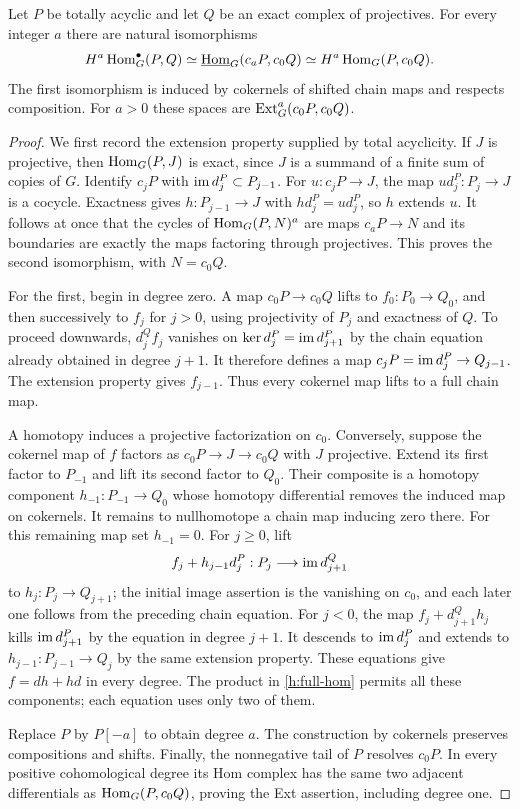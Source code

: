 \begin{lemma}\label{h:comparison}
Let $P$ be totally acyclic and let $Q$ be an exact complex of projectives.
For every integer $a$ there are natural isomorphisms
\begin{equation}\label{h:comparison-formula}
 H^a\operatorname{Hom}_G^\bullet(P,Q)
 \simeq\underline{\operatorname{Hom}}_G(c_aP,c_0Q)
 \simeq H^a\operatorname{Hom}_G(P,c_0Q).
\end{equation}
The first isomorphism is induced by cokernels of shifted chain maps and
respects composition. For $a>0$ these spaces are
$\operatorname{Ext}_G^a(c_0P,c_0Q)$.
\end{lemma}

\begin{proof}
We first record the extension property supplied by total acyclicity. If $J$
is projective, then $\operatorname{Hom}_G(P,J)$ is exact, since $J$ is a summand of a finite
sum of copies of $G$. Identify $c_jP$ with $\operatorname{im} d_j^P\subset P_{j-1}$.
For $u:c_jP\to J$, the map $u d_j^P:P_j\to J$ is a cocycle.
Exactness gives $h:P_{j-1}\to J$ with $h d_j^P=u d_j^P$, so $h$ extends $u$.
It follows at once that the cycles of $\operatorname{Hom}_G(P,N)^a$ are maps
$c_aP\to N$ and its boundaries are exactly the maps factoring through
projectives. This proves the second isomorphism, with $N=c_0Q$.

For the first, begin in degree zero. A map $c_0P\to c_0Q$ lifts to
$f_0:P_0\to Q_0$, and then successively to $f_j$ for $j>0$, using
projectivity of $P_j$ and exactness of $Q$. To proceed downwards,
$d_j^Qf_j$ vanishes on $\ker d_j^P=\operatorname{im} d_{j+1}^P$ by the chain equation
already obtained in degree $j+1$. It therefore defines a map
$c_jP=\operatorname{im} d_j^P\to Q_{j-1}$. The extension property gives $f_{j-1}$.
Thus every cokernel map lifts to a full chain map.

A homotopy induces a projective factorization on $c_0$. Conversely, suppose
the cokernel map of $f$ factors as $c_0P\to J\to c_0Q$ with $J$ projective.
Extend its first factor to $P_{-1}$ and lift its second factor to $Q_0$.
Their composite is a homotopy component $h_{-1}:P_{-1}\to Q_0$ whose
homotopy differential removes the induced map on cokernels. It remains to
nullhomotope a chain map inducing zero there. For this remaining map set
$h_{-1}=0$. For $j\geq0$, lift
\[
 f_j+h_{j-1}d_j^P:P_j\longrightarrow\operatorname{im} d_{j+1}^Q
\]
to $h_j:P_j\to Q_{j+1}$; the initial image assertion is the vanishing on
$c_0$, and each later one follows from the preceding chain equation.
For $j<0$, the map $f_j+d_{j+1}^Qh_j$ kills $\operatorname{im} d_{j+1}^P$ by the equation
in degree $j+1$. It descends to $\operatorname{im} d_j^P$ and extends to
$h_{j-1}:P_{j-1}\to Q_j$ by the same extension property. These equations
give $f=dh+hd$ in every degree. The product in \eqref{h:full-hom} permits all
these components; each equation uses only two of them.

Replace $P$ by $P[-a]$ to obtain degree $a$. The construction by cokernels
preserves compositions and shifts. Finally, the nonnegative tail of $P$
resolves $c_0P$. In every positive cohomological degree its Hom complex has
the same two adjacent differentials as $\operatorname{Hom}_G(P,c_0Q)$, proving the Ext
assertion, including degree one.
\end{proof}

